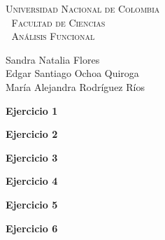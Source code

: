 \documentclass[12pt, a4paper]{article}%
\begin{document}
\setlength{\parindent}{0cm}
\hoffset-0.46cm
\voffset-1.46cm

\begin{window}
\large\scshape  \hspace{0.4cm}\textsf{Universidad Nacional de Colombia} \\
\textcolor{white}{\tiny.}  \large \hspace{1.5cm} \textsf{Facultad de Ciencias} \\
\textcolor{white}{\tiny.}   \normalsize\hspace{0.7cm}\textsf{Análisis Funcional}\\
 

\end{window}

\vspace{0.2cm}
\small
\textsf{Sandra Natalia Flores\\Edgar Santiago Ochoa Quiroga\\
María Alejandra  Rodríguez  Ríos} 
\normalsize
\dotfill
\vspace{0.7cm}

 \textbf{Ejercicio 1}
  

  \textbf{Ejercicio 2}
 
 
 

 \textbf{Ejercicio 3}
 
 
  \textbf{Ejercicio 4}
 

  \textbf{Ejercicio 5}
 

  \textbf{Ejercicio 6}
 
 






 
\end{document}
